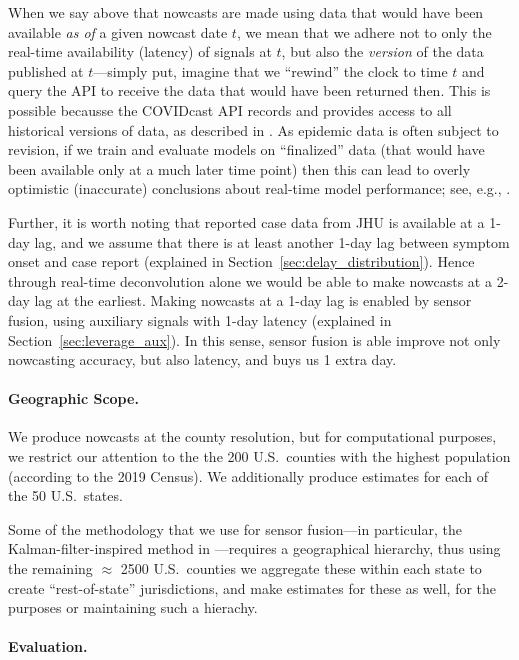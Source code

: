 \documentclass[sts]{imsart}
\theoremstyle{plain}
\theoremstyle{definition}
\theoremstyle{remark}
\begin{document}
When we say above that nowcasts are made using data that would have been
available \emph{as of} a given nowcast date $t$, we mean that we adhere not to
only the real-time availability (latency) of signals at $t$, but also the 
\emph{version} of the data published at $t$---simply put, imagine that we
``rewind'' the clock to time $t$ and query the API to receive the data that
would have been returned then. This is possible becausse the COVIDcast API
records and provides access to all historical versions of data, as described in 
\citet{Reinhart:2021}. As epidemic data is often subject to revision, if we
train and evaluate models on ``finalized'' data (that would have been available
only at a much later time point) then this can lead to overly optimistic
(inaccurate) conclusions about real-time model performance; see, e.g.,
\citet{McDonald:2021}. 

Further, it is worth noting that reported case data from JHU is available at a
1-day lag, and we assume that there is at least another 1-day lag between
symptom onset and case report (explained in
Section~\ref{sec:delay_distribution}). Hence through real-time deconvolution
alone we would be able to make nowcasts at a 2-day lag at the earliest. Making
nowcasts at a 1-day lag is enabled by sensor fusion, using auxiliary signals
with 1-day latency (explained in Section~\ref{sec:leverage_aux}). In this sense,
sensor fusion is able improve not only nowcasting accuracy, but also latency,
and buys us 1 extra day.

\smallskip
\paragraph*{Geographic Scope.}

We produce nowcasts at the county resolution, but for computational purposes, we
restrict our attention to the the 200 U.S.\ counties with the highest population
(according to the 2019 Census). We additionally produce estimates for each 
of
the 50 U.S.\ states.

Some of the methodology that we use for sensor fusion---in particular, the
Kalman-filter-inspired method in \citet{Farrow:2016}---requires a
geographical hierarchy, thus using the remaining $\approx$ 2500 U.S.\ counties
we aggregate these within each state to create ``rest-of-state'' jurisdictions,  
and make estimates for these as well, for the purposes or maintaining such a
hierachy. 

\smallskip
\paragraph*{Evaluation.}
\end{document}

